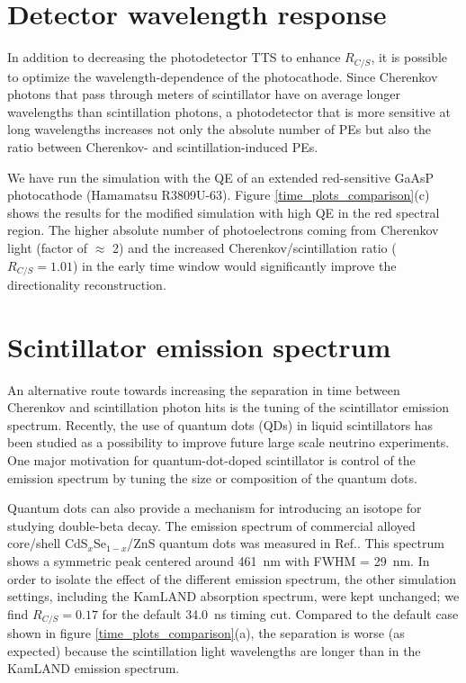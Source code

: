 \documentclass[cits]{JINST}
\begin{document}
\section{Detector wavelength response}
\label{detector_wavelength_response_sec} 
In addition to decreasing the photodetector TTS to enhance $R_{C/S}$,
it is possible to optimize the wavelength-dependence of the
photocathode. Since Cherenkov photons that pass through meters of
scintillator have on average longer wavelengths than scintillation
photons, a photodetector that is more sensitive at long wavelengths
increases not only the absolute number of PEs but also the ratio
between Cherenkov- and scintillation-induced PEs.

We have run the simulation with the QE of an extended red-sensitive
GaAsP photocathode (Hamamatsu R3809U-63)\cite{Hamamatsu_R3899U}.
Figure \ref{time_plots_comparison}(c) shows the results for the
modified simulation with high QE in the red spectral region. The
higher absolute number of photoelectrons coming from Cherenkov light
(factor of $\approx$ 2) and the increased Cherenkov/scintillation
ratio ($R_{C/S}=1.01$) in the early time window would significantly improve the
directionality reconstruction.

\section{Scintillator emission spectrum}
\label{scintillator_emission_sec}
An alternative route towards increasing the separation in time between
Cherenkov and scintillation photon hits is the tuning of the
scintillator emission spectrum. Recently, the use of quantum dots
(QDs) in liquid scintillators has been studied as a possibility to
improve future large scale neutrino experiments\cite{qdot,qdot2}. One
major motivation for quantum-dot-doped scintillator is control of the
emission spectrum by tuning the size or composition of the quantum
dots. 

Quantum dots can also provide a mechanism for introducing an 
isotope for studying double-beta decay. The emission spectrum of commercial alloyed core/shell
CdS$_x$Se$_{1-x}$/ZnS quantum dots was measured in
Ref.\cite{qdot2}. This spectrum shows a symmetric peak centered
around 461~nm with FWHM = 29~nm.  In order to isolate the effect of
the different emission spectrum, the other simulation settings,
including the KamLAND absorption spectrum, were kept unchanged; we
find $R_{C/S}=0.17$ for the default 34.0~ns timing cut.  Compared to
the default case shown in figure \ref{time_plots_comparison}(a), the
separation is worse (as expected) because the scintillation light
wavelengths are longer than in the KamLAND emission spectrum.
\end{document}
